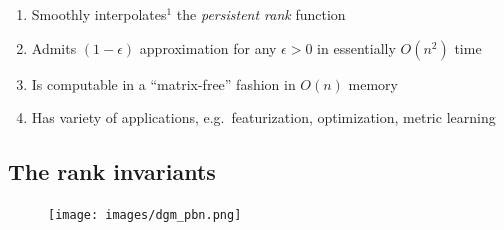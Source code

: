\documentclass[
  letterpaper,
  DIV=11,
  numbers=noendperiod,
  oneside]{scrartcl}
\providecommand{\tightlist}{%
  \setlength{\itemsep}{0pt}\setlength{\parskip}{0pt}}\usepackage{longtable,booktabs,array}
\begin{document}
\begin{enumerate}
\def\labelenumi{\arabic{enumi}.}
\tightlist
\item
  Smoothly interpolates\(^1\) the \emph{persistent rank} function
\item
  Admits \((1{\textstyle -}\epsilon)\) approximation for any
  \(\epsilon > 0\) in essentially \(O(n^2)\) time
\item
  Is computable in a ``matrix-free'' fashion in \(O(n)\) memory
\item
  Has variety of applications, e.g.~featurization, optimization, metric
  learning
\end{enumerate}

\begin{figure}

\begin{minipage}[t]{0.48\linewidth}

{\centering 


}

\end{minipage}%
%
\begin{minipage}[t]{0.52\linewidth}

{\centering 


}

\end{minipage}%

\end{figure}


\subsection{The rank invariants}\label{the-rank-invariants}

\begin{figure}

{\centering \texttt{[image: images/dgm\_pbn.png]}

}

\end{figure}
\end{document}
